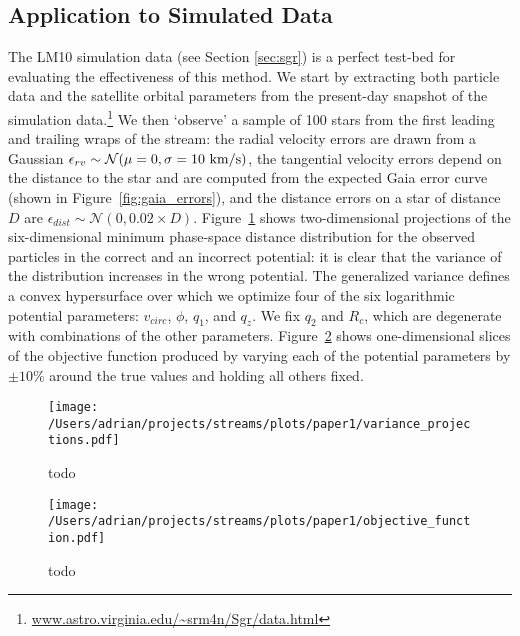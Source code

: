 \documentclass[preprint]{aastex}
\begin{document}
\subsection{Application to Simulated Data} \label{sec:results}
The LM10 simulation data (see Section \ref{sec:sgr}) is a perfect
test-bed for evaluating the effectiveness of this method. We start by
extracting both particle data and the satellite orbital parameters
from the present-day snapshot of the simulation
data.\footnote{\url{www.astro.virginia.edu/~srm4n/Sgr/data.html}} We
then `observe' a sample of 100 stars from the first leading and
trailing wraps of the stream: the radial velocity errors are drawn
from a Gaussian $\epsilon_{rv} \sim \mathcal{N}(\mu=0,\sigma=10~{\rm
  km/s})$, the tangential velocity errors depend on the distance to
the star and are computed from the expected Gaia error curve (shown in
Figure~\ref{fig:gaia_errors}), and the distance errors on a star of
distance $D$ are $\epsilon_{dist} \sim \mathcal{N}(0,0.02\times
D)$. Figure~\ref{fig:variance_proj} shows two-dimensional projections
of the six-dimensional minimum phase-space distance distribution for
the observed particles in the correct and an incorrect potential: it
is clear that the variance of the distribution increases in the wrong
potential. The generalized variance defines a convex hypersurface over
which we optimize four of the six logarithmic potential parameters:
$v_{circ}$, $\phi$, $q_1$, and $q_z$. We fix $q_2$ and $R_c$, which
are degenerate with combinations of the other
parameters. Figure~\ref{fig:objective} shows one-dimensional slices of
the objective function produced by varying each of the potential
parameters by $\pm10\%$ around the true values and holding all others
fixed.

\begin{figure}[h]
\begin{center}
\texttt{[image: /Users/adrian/projects/streams/plots/paper1/variance\_projections.pdf]}
\caption{ todo }\label{fig:variance_proj}
\end{center}
\end{figure}

\begin{figure}[h]
\begin{center}
\texttt{[image: /Users/adrian/projects/streams/plots/paper1/objective\_function.pdf]}
\caption{ todo }\label{fig:objective}
\end{center}
\end{figure}
\end{document}
